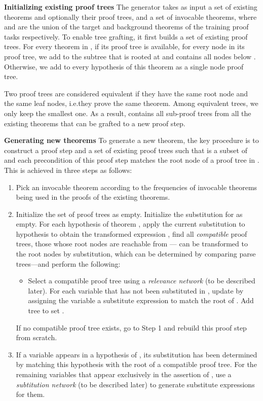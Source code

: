 \documentclass{article}
\begin{document}
\noindent\textbf{Initializing existing proof trees}
The generator takes as input a set  of existing theorems and optionally their proof trees, and a set  of invocable theorems, where  and  are the union of the target and background theorems of the training proof tasks respectively.
To enable tree grafting,
it first builds a set  of existing proof trees.
For every theorem in , if its proof tree is available, for every node  in its proof tree, we add to  the subtree that is rooted at  and contains all nodes below . Otherwise, we add to  every hypothesis of this theorem as a single node proof tree. 

Two proof trees are considered equivalent if they have the same root node and the same 
leaf nodes, i.e.\@ they prove the same theorem. Among equivalent trees, we
only keep the smallest one. As a result,  contains all sub-proof trees from all the existing theorems that can be grafted to a new proof step. 

\noindent\textbf{Generating new theorems}
To generate a new theorem,
the key procedure is to construct a proof step and a set  of existing proof trees such that  is a subset of  and 
each precondition of this proof step matches the root node of a proof tree in . This is achieved in three steps as follows: 

\begin{enumerate}
	\item Pick an invocable theorem  according to the frequencies of invocable theorems being used in the proofs of the existing theorems.  
	\item Initialize the set  of proof trees as empty. Initialize the substitution  for  as empty. For each hypothesis  of theorem , apply the current substitution  to hypothesis  to obtain the transformed expression , find all \emph{compatible} proof trees, those whose root nodes are reachable from --- can be transformed to the root nodes by substitution, which can be determined by comparing parse trees---and perform the following:
	\begin{itemize}
	    \item Select a compatible proof tree  using a \emph{relevance network} (to be described later). For each variable that has not been substituted in , update  by assigning the variable a substitute expression to match the root of . Add tree  to set . 
	\end{itemize}
	If no compatible proof tree exists, go to Step 1 and rebuild this proof step from scratch. 
	\item
	If a variable appears in a hypothesis of , 
	its substitution has been determined by matching this hypothesis with the root of a compatible proof tree. 
	For the remaining variables that appear exclusively in the assertion of , use a \emph{subtitution network} (to be described later) to generate substitute expressions for them. 
\end{enumerate}
\end{document}

